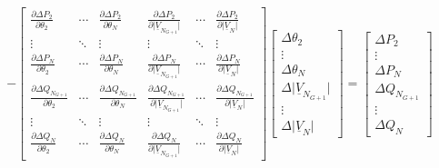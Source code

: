 \begin{align*}
- \left [ \begin{array}{cccccc} \frac{\partial \Delta P_{2} }{\partial \theta_{2}} & \cdots & \frac{\partial \Delta P_{2} }{\partial \theta_{N}}   &    
			\frac{\partial \Delta P_{2} }{\partial \vert \underline{V}_{N_{G+1}} \vert}    &   \cdots   &    \frac{\partial \Delta P_{2} }{\partial \vert \underline{V}_{N} \vert}	\\
			\vdots & \ddots & \vdots   &  \vdots  &   \ddots   &   \vdots	\\ 
			 \frac{\partial \Delta P_{N} }{\partial \theta_{2}} & \cdots & \frac{\partial \Delta P_{N}}{\partial \theta_{N}}   &    
			\frac{\partial \Delta P_{N}}{\partial \vert \underline{V}_{N_{G+1}} \vert }    &   \cdots   &    \frac{\partial \Delta P_{N}}{\partial \vert \underline{V}_{N} \vert} \\
			 \frac{\partial \Delta Q_{N_{G+1}} }{\partial \theta_{2}} & \cdots & \frac{\partial \Delta Q_{N_{G+1}} }{\partial \theta_{N}}   &    
			\frac{\partial \Delta Q_{N_{G+1}} }{\partial \vert \underline{V}_{N_{G+1}} \vert }    &   \cdots   &    \frac{\partial \Delta Q_{N_{G+1}} }{\partial \vert \underline{V}_{N} \vert}	\\
			\vdots & \ddots & \vdots   &  \vdots  &   \ddots   &   \vdots	\\ 
			 \frac{\partial \Delta Q_{N}}{\partial \theta_{2}} & \cdots & \frac{\partial \Delta Q_{N}}{\partial \theta_{N}}   &    
			\frac{\partial \Delta Q_{N}}{\partial \vert \underline{V}_{N_{G+1}} \vert }  &   \cdots   &    \frac{\partial \Delta Q_{N}}{\partial \vert \underline{V}_{N} \vert}
			\end{array} \right ]
\left [ \begin{array}{c} \Delta \theta_{2} \\ \vdots  \\ \Delta \theta_{N}  \\   \Delta \vert \underline{V}_{N_{G+1}} \vert \\ \vdots \\ \Delta \vert \underline{V}_{N} \vert \end{array}  \right ]
= \left [ \begin{array}{c} \Delta P_{2} \\ \vdots  \\ \Delta P_{N}  \\  \Delta Q_{N_{G+1}} \\ \vdots \\ \Delta Q_{N} \end{array}  \right ]
\end{align*}

